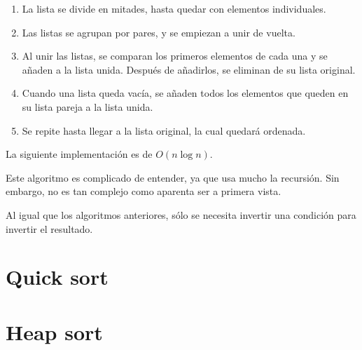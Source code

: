 \begin{enumerate}
  \item La lista se divide en mitades, hasta quedar con elementos individuales.
  
  \item Las listas se agrupan por pares, y se empiezan a unir de vuelta.

  \item Al unir las listas, se comparan los primeros elementos de cada una y se añaden a la lista unida.
  Después de añadirlos, se eliminan de su lista original.
  
  \item Cuando una lista queda vacía, se añaden todos los elementos que queden en su lista pareja a la lista unida.

  \item Se repite hasta llegar a la lista original, la cual quedará ordenada.
  
\end{enumerate}

La siguiente implementación es de $O(n \log{n})$.


Este algoritmo es complicado de entender, ya que usa mucho la recursión.
Sin embargo, no es tan complejo como aparenta ser a primera vista.

Al igual que los algoritmos anteriores, sólo se necesita invertir una condición para invertir el resultado.





\section{Quick sort}

\section{Heap sort}

\clearpage
